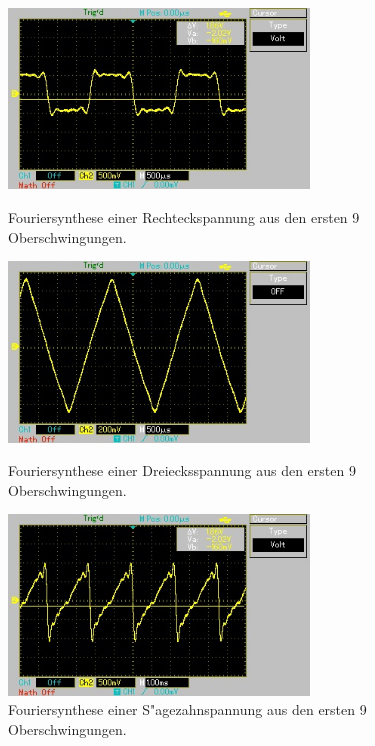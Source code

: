 \begin{figure}[!h]
	\centering
	\includegraphics[width = 8cm]{img/rechteck.jpg}
	\caption{Fouriersynthese einer Rechteckspannung aus den ersten 9 Oberschwingungen.}
	\label{fg:recht}

	\includegraphics[width = 8cm]{img/dreieck.jpg}
	\caption{Fouriersynthese einer Dreiecksspannung aus den ersten 9 Oberschwingungen.}
	\label{fg:dreieck}

	\includegraphics[width = 8cm]{img/saege.jpg}
	\caption{Fouriersynthese einer S"agezahnspannung aus den ersten 9 Oberschwingungen.}
	\label{fg:recht}
\end{figure}

